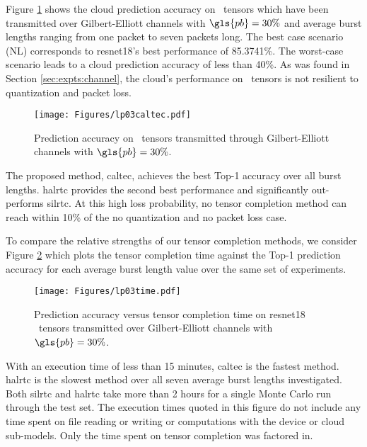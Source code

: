 Figure \ref{fig:expts:default:30} shows the cloud prediction accuracy on \addone~tensors which have been transmitted over Gilbert-Elliott channels with $\gls{pb} = 30\%$ and average burst lengths ranging from one packet to seven packets long. The best case scenario (NL) corresponds to \gls{resnet18}'s best performance of 85.3741\%. The worst-case scenario leads to a cloud prediction accuracy of less than 40\%. As was found in Section \ref{sec:expts:channel}, the cloud's performance on \addone~tensors is not resilient to quantization and packet loss.

\begin{figure}[H]
	\centering 
	\texttt{[image: Figures/lp03caltec.pdf]}
	\caption[Monte Carlo experiment results with loss probability 0.3 on ResNet18 tensors]{Prediction accuracy on \addone~tensors transmitted through Gilbert-Elliott channels with $\gls{pb} = 30\%$.}
	\label{fig:expts:default:30}
\end{figure}

The proposed method, \gls{caltec}, achieves the best Top-1 accuracy over all burst lengths. \gls{halrtc} provides the second best performance and significantly out-performs \gls{silrtc}. At this high loss probability, no tensor completion method can reach within 10\% of the no quantization and no packet loss case.

To compare the relative strengths of our tensor completion methods, we consider Figure \ref{fig:expts:default:30:time} which plots the tensor completion time against the Top-1 prediction accuracy for each average burst length value over the same set of experiments.

\begin{figure}[H]
	\centering
	\texttt{[image: Figures/lp03time.pdf]}
	\caption[Prediction accuracy versus tensor completion time with Gilbert-Elliott channels with loss probability 0.3 on ResNet18 tensors]{Prediction accuracy versus tensor completion time on \gls{resnet18} \addone~tensors transmitted over Gilbert-Elliott channels with $\gls{pb} = 30\%$.}
	\label{fig:expts:default:30:time}
\end{figure}

With an execution time of less than 15 minutes, \gls{caltec} is the fastest method. \gls{halrtc} is the slowest method over all seven average burst lengths investigated. Both \gls{silrtc} and \gls{halrtc} take more than 2 hours for a single Monte Carlo run through the test set. The execution times quoted in this figure do not include any time spent on file reading or writing or computations with the device or cloud sub-models. Only the time spent on tensor completion was factored in.

